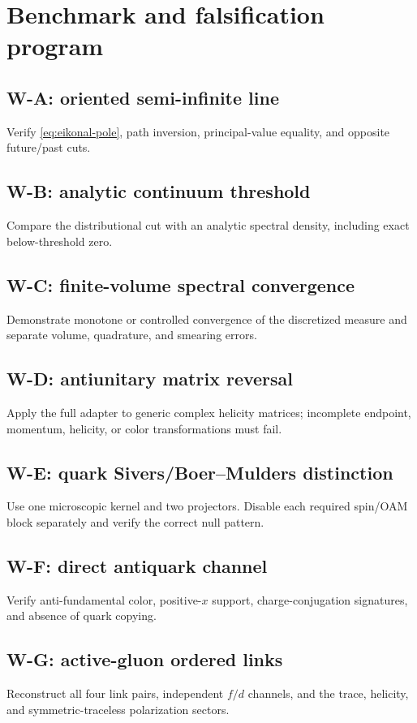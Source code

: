 \documentclass[11pt]{article}
\begin{document}
\section{Benchmark and falsification program}
\label{sec:benchmarks}

\subsection{W-A: oriented semi-infinite line}
Verify \cref{eq:eikonal-pole}, path inversion, principal-value equality, and
opposite future/past cuts.

\subsection{W-B: analytic continuum threshold}
Compare the distributional cut with an analytic spectral density, including
exact below-threshold zero.

\subsection{W-C: finite-volume spectral convergence}
Demonstrate monotone or controlled convergence of the discretized measure and
separate volume, quadrature, and smearing errors.

\subsection{W-D: antiunitary matrix reversal}
Apply the full adapter to generic complex helicity matrices; incomplete
endpoint, momentum, helicity, or color transformations must fail.

\subsection{W-E: quark Sivers/Boer--Mulders distinction}
Use one microscopic kernel and two projectors.  Disable each required spin/OAM
block separately and verify the correct null pattern.

\subsection{W-F: direct antiquark channel}
Verify anti-fundamental color, positive-\(x\) support, charge-conjugation
signatures, and absence of quark copying.

\subsection{W-G: active-gluon ordered links}
Reconstruct all four link pairs, independent \(f/d\) channels, and the trace,
helicity, and symmetric-traceless polarization sectors.
\end{document}
